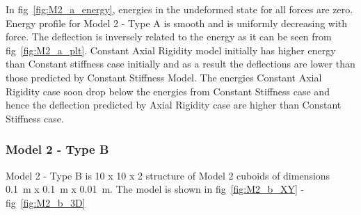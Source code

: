 In fig~\ref{fig:M2_a_energy}, energies in the undeformed state for all forces are zero. Energy profile for Model 2 - Type A is smooth and is uniformly decreasing with force. The deflection is inversely related to the energy as it can be seen from fig~\ref{fig:M2_a_plt}. Constant Axial Rigidity model initially has higher energy than Constant stiffness case initially and as a result the deflections are lower than those predicted by Constant Stiffness Model. The energies Constant Axial Rigidity case soon drop below the energies from Constant Stiffness case and hence the deflection predicted by Axial Rigidity case are higher than Constant Stiffness case.

\subsubsection{Model 2 - Type B}
Model 2 - Type B is 10 x 10 x 2 structure of Model 2 cuboids of dimensions 0.1~m x 0.1~m x 0.01~m. The model is shown in fig~\ref{fig:M2_b_XY} - fig~\ref{fig:M2_b_3D}

